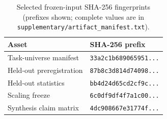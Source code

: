 
\begin{table}[ht]
\centering
\caption{Selected frozen-input SHA-256 fingerprints (prefixes shown; complete values are in \texttt{supplementary/artifact\_manifest.txt}).}
\label{tab:artifact-hashes}
\small
\begin{tabular}{@{}ll@{}}
\toprule
Asset & SHA-256 prefix \\
\midrule
Task-universe manifest & \texttt{33a2c1b689065951...} \\
Held-out preregistration & \texttt{87b8c3d814d74098...} \\
Held-out statistics & \texttt{bb4d24d65cd2cf9c...} \\
Scaling freeze & \texttt{6c0df9df4f7a1c00...} \\
Synthesis claim matrix & \texttt{4dc908667e31774f...} \\
\bottomrule
\end{tabular}
\end{table}
